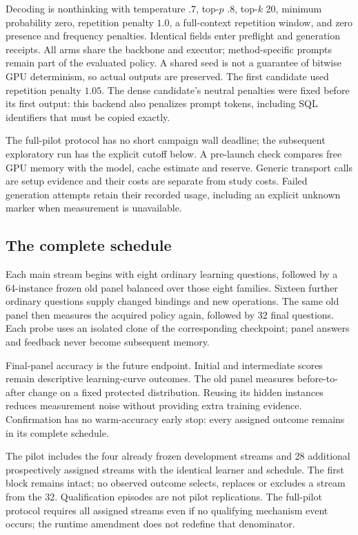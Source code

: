 \documentclass[10pt,twocolumn]{article}
\begin{document}
Decoding is nonthinking with temperature $.7$, top-$p$ $.8$, top-$k$ 20,
minimum probability zero, repetition penalty $1.0$, a full-context repetition
window, and zero presence and frequency penalties. Identical fields enter
preflight and generation receipts. All arms share the backbone and executor;
method-specific prompts remain part of the evaluated policy. A shared seed is
not a guarantee of bitwise GPU determinism, so actual outputs are preserved.
The first candidate used repetition penalty $1.05$. The dense candidate's
neutral penalties were fixed before its first output: this backend also
penalizes prompt tokens, including SQL identifiers that must be copied exactly.

The full-pilot protocol has no short campaign wall deadline; the subsequent
exploratory run has the explicit cutoff below. A pre-launch check
compares free GPU memory with the model, cache estimate and reserve. Generic
transport calls are setup evidence and their costs are separate from study
costs. Failed generation attempts retain their recorded usage, including an
explicit unknown marker when measurement is unavailable.

\subsection{The complete schedule}
Each main stream begins with eight ordinary learning questions, followed by a
64-instance frozen old panel balanced over those eight families. Sixteen further
ordinary questions supply changed bindings and new operations. The same old
panel then measures the acquired policy again, followed by 32 final questions.
Each probe uses an isolated clone of the corresponding checkpoint; panel
answers and feedback never become subsequent memory.

Final-panel accuracy is the future endpoint. Initial and intermediate scores
remain descriptive learning-curve outcomes. The old panel measures
before-to-after change on a fixed protected distribution. Reusing its hidden
instances reduces measurement noise without providing extra training evidence.
Confirmation has no warm-accuracy early stop: every assigned outcome remains
in its complete schedule.

The pilot includes the four already frozen development streams and 28 additional
prospectively assigned streams with the identical learner and schedule. The
first block remains intact; no observed outcome selects, replaces or excludes
a stream from the 32. Qualification episodes are not pilot replications. The
full-pilot protocol requires all assigned streams even if no qualifying
mechanism event occurs; the runtime amendment does not redefine that denominator.
\end{document}
